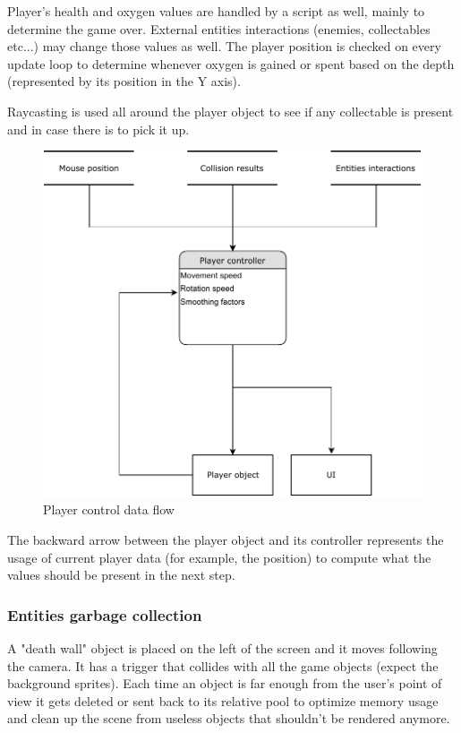 \documentclass[11pt]{article}
\begin{document}
Player's health and oxygen values are handled by a script as well, mainly to determine the game over. External entities interactions (enemies, collectables etc...) may change those values as well.
The player position is checked on every update loop to determine whenever oxygen is gained or spent based on the depth (represented by its position in the Y axis).

Raycasting is used all around the player object to see if any collectable is present and in case there is to pick it up.

\begin{figure}[H]
  \centering
  \includegraphics[width=1.0\textwidth]{figures/player_controller}
  \caption{Player control data flow}
\end{figure}

The backward arrow between the player object and its controller represents the usage of current player data (for example, the position) to compute what the values should be present in the next step.

\subsubsection{Entities garbage collection}
A "death wall" object is placed on the left of the screen and it moves following the camera. It has a trigger that collides with all the game objects (expect the background sprites). Each time an object is far enough from the user's point of view it gets deleted or sent back to its relative pool to optimize memory usage and clean up the scene from useless objects that shouldn't be rendered anymore.
\end{document}
